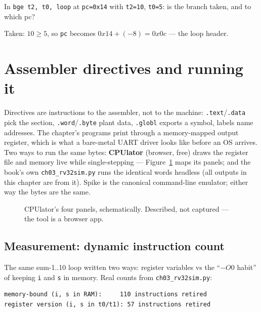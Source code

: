 \begin{checkpoint}
In \texttt{bge t2, t0, loop} at \texttt{pc=0x14} with \texttt{t2=10},
\texttt{t0=5}: is the branch taken, and to which pc?
\end{checkpoint}
\begin{solution}
Taken: $10 \geq 5$, so \texttt{pc} becomes $0x14 + (-8) = 0x0c$ ---
the loop header.
\end{solution}

\section{Assembler directives and running it}
\label{sec:run03}

Directives are instructions to the assembler, not to the machine:
\texttt{.text}/\texttt{.data} pick the section, \texttt{.word}/\texttt{.byte}
plant data, \texttt{.globl} exports a symbol, labels name addresses.
The chapter's programs print through a memory-mapped output register,
which is what a bare-metal UART driver looks like before an OS arrives.
Two ways to run the same bytes: \textbf{CPUlator} (browser, free) draws
the register file and memory live while single-stepping ---
Figure~\ref{fig:cpulator03} maps its panels; and the book's own
\texttt{ch03\_rv32sim.py} runs the identical words headless (all
outputs in this chapter are from it). Spike is the canonical
command-line emulator; either way the bytes are the same.

\begin{figure}[htbp]
\centering

\caption{CPUlator's four panels, schematically. Described, not
captured --- the tool is a browser app.}
\label{fig:cpulator03}
\end{figure}

\subsection{Measurement: dynamic instruction count}
\label{sec:measure03}

The same sum-1..10 loop written two ways: register variables vs the
``$-O0$ habit'' of keeping \texttt{i} and \texttt{s} in memory. Real
counts from \texttt{ch03\_rv32sim.py}:

\begin{lstlisting}[basicstyle=\ttfamily\scriptsize]
memory-bound (i, s in RAM):     110 instructions retired
register version (i, s in t0/t1): 57 instructions retired
\end{lstlisting}

